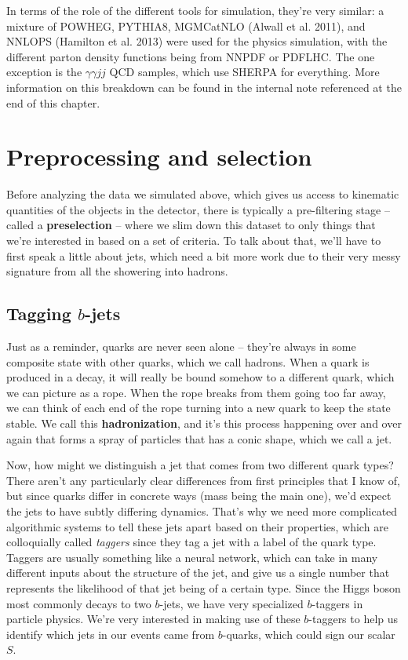 \documentclass[
  11pt,
  numbers=noendperiod]{book}
\begin{document}
In terms of the role of the different tools for simulation, they're very similar: a mixture of POWHEG, PYTHIA8, MGMCatNLO (Alwall et al. 2011), and NNLOPS (Hamilton et al. 2013) were used for the physics simulation, with the different parton density functions being from NNPDF or PDFLHC. The one exception is the \(\gamma\gamma jj\) QCD samples, which use SHERPA for everything. More information on this breakdown can be found in the internal note referenced at the end of this chapter.


\hypertarget{preprocessing-and-selection}{%
\section{Preprocessing and
selection}\label{preprocessing-and-selection}}

Before analyzing the data we simulated above, which gives us access to
kinematic quantities of the objects in the detector, there is typically
a pre-filtering stage -- called a \textbf{preselection} -- where we slim
down this dataset to only things that we're interested in based on a set
of criteria. To talk about that, we'll have to first speak a little
about jets, which need a bit more work due to their very messy signature
from all the showering into hadrons.

\hypertarget{tagging-b-jets}{%
\subsection{\texorpdfstring{Tagging
\(b\)-jets}{Tagging b-jets}}\label{tagging-b-jets}}

Just as a reminder, quarks are never seen alone -- they're always in
some composite state with other quarks, which we call hadrons. When a
quark is produced in a decay, it will really be bound somehow to a
different quark, which we can picture as a rope. When the rope breaks
from them going too far away, we can think of each end of the rope
turning into a new quark to keep the state stable. We call this
\textbf{hadronization}, and it's this process happening over and over
again that forms a spray of particles that has a conic shape, which we
call a jet.

Now, how might we distinguish a jet that comes from two different quark
types? There aren't any particularly clear differences from first
principles that I know of, but since quarks differ in concrete ways
(mass being the main one), we'd expect the jets to have subtly differing
dynamics. That's why we need more complicated algorithmic systems to
tell these jets apart based on their properties, which are colloquially
called \emph{taggers} since they tag a jet with a label of the quark
type. Taggers are usually something like a neural network, which can
take in many different inputs about the structure of the jet, and give
us a single number that represents the likelihood of that jet being of a
certain type. Since the Higgs boson most commonly decays to two
\(b\)-jets, we have very specialized \(b\)-taggers in particle physics.
We're very interested in making use of these \(b\)-taggers to help us
identify which jets in our events came from \(b\)-quarks, which could
sign our scalar \(S\).
\end{document}
